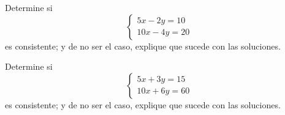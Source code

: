 	Determine si
	$$\begin{cases}
		5x-2y=10\\
		10x-4y=20
	\end{cases}$$
	es consistente; y de no ser el caso, explique que sucede con las soluciones.



	Determine si
	$$\begin{cases}
		5x+3y=15\\
		10x+6y=60
	\end{cases}$$
	es consistente; y de no ser el caso, explique que sucede con las soluciones.






